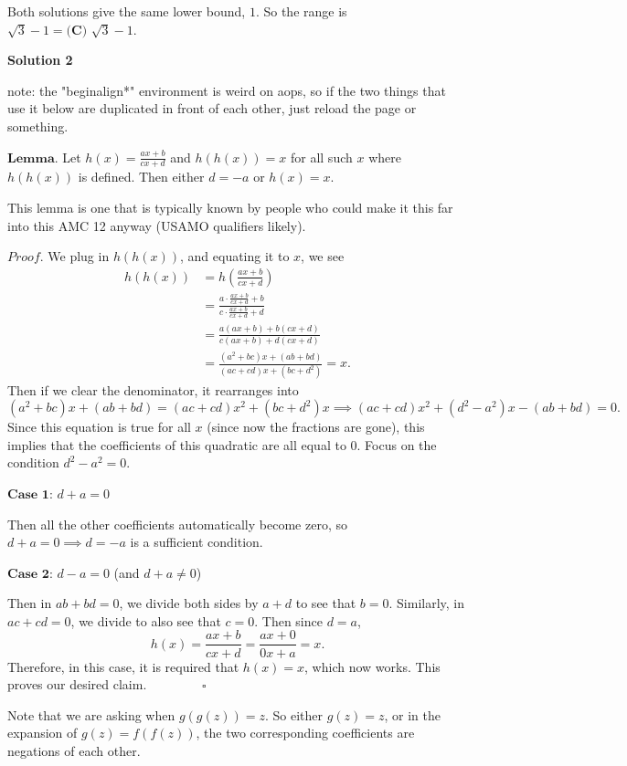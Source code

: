 \begin{enumerate}
 Both solutions give the same lower bound, $1$. So the range is $\sqrt{3}-1=\boxed{\textbf{(C) }\sqrt{3}-1}$.

 



\textbf{Solution 2}

note: the "begin{align*}" environment is weird on aops, so if the two things that use it below are duplicated in front of each other, just reload the page or something.

 $\textbf{Lemma.}$ Let $h(x)=\frac{ax+b}{cx+d}$ and $h\left (h(x)\right )=x$ for all such $x$ where $h(h(x))$ is defined. Then either $d=-a$ or $h(x)=x$.

 This lemma is one that is typically known by people who could make it this far into this AMC 12 anyway (USAMO qualifiers likely). 

 $\textit{Proof.}$ We plug in $h\left (h(x)\right )$, and equating it to $x$, we see\begin{align*}h\left (h(x)\right ) &=h\left (\frac{ax+b}{cx+d}\right ) \\ &= \frac{a\cdot \frac{ax+b}{cx+d}+b}{c\cdot \frac{ax+b}{cx+d}+d} \\ &= \frac{a(ax+b)+b(cx+d)}{c(ax+b)+d(cx+d)} \\ &= \frac{(a^2+bc)x+(ab+bd)}{(ac+cd)x+(bc+d^2)}=x.\end{align*}
Then if we clear the denominator, it rearranges into 
 \[(a^2+bc)x+(ab+bd)=(ac+cd)x^2+(bc+d^2)x\implies (ac+cd)x^2+(d^2-a^2)x-(ab+bd)=0.\] Since this equation is true for all $x$ (since now the fractions are gone), this implies that the coefficients of this quadratic are all equal to $0$. Focus on the condition $d^2-a^2=0$.

 $\textbf{Case 1:}$ $d+a=0$

 Then all the other coefficients automatically become zero, so $d+a=0\implies d=-a$ is a sufficient condition.

 $\textbf{Case 2:}$ $d-a=0$ (and $d+a\neq 0$)

 Then in $ab+bd=0$, we divide both sides by $a+d$ to see that $b=0$. Similarly, in $ac+cd=0$, we divide to also see that $c=0$. Then since $d=a$, 
 \[h(x)=\frac{ax+b}{cx+d}=\frac{ax+0}{0x+a}=x.\] Therefore, in this case, it is required that $h(x)=x$, which now works. This proves our desired claim. $\qquad \qquad \square$

 Note that we are asking when $g(g(z))=z$. So either $g(z)=z$, or in the expansion of $g(z)=f(f(z))$, the two corresponding coefficients are negations of each other. 


\end{enumerate}
